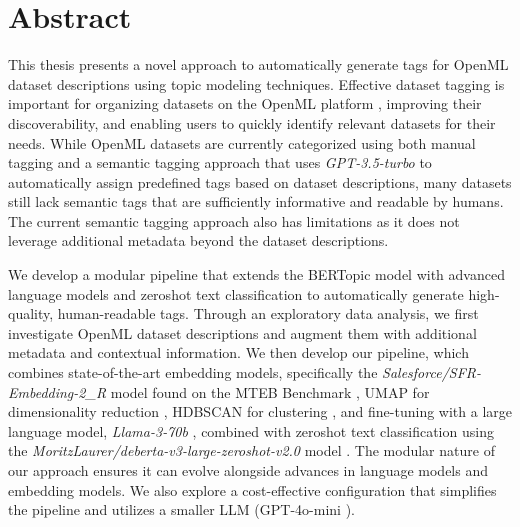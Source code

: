 \chapter*{Abstract}\label{chapter:abstract}

This thesis presents a novel approach to automatically generate tags for OpenML dataset descriptions using topic modeling techniques. Effective dataset tagging is important for organizing datasets on the OpenML platform \cite{vanschoren_openml_2014}, improving their discoverability, and enabling users to quickly identify relevant datasets for their needs. While OpenML datasets are currently categorized using both manual tagging and a semantic tagging approach that uses \textit{GPT-3.5-turbo} to automatically assign predefined tags based on dataset descriptions, many datasets still lack semantic tags that are sufficiently informative and readable by humans. The current semantic tagging approach also has limitations as it does not leverage additional metadata beyond the dataset descriptions.

We develop a modular pipeline that extends the BERTopic model \cite{grootendorst_bertopic_2022} with advanced language models and zeroshot text classification to automatically generate high-quality, human-readable tags. Through an exploratory data analysis, we first investigate OpenML dataset descriptions and augment them with additional metadata and contextual information. We then develop our pipeline, which combines state-of-the-art embedding models, specifically the \textit{Salesforce/SFR-Embedding-2\_R} \cite{noauthor_salesforcesfr-embedding-2_r_2024} model found on the MTEB Benchmark \cite{muennighoff_mteb_2023}, UMAP for dimensionality reduction \cite{mcinnes_umap_2020}, HDBSCAN for clustering \cite{campello_density-based_2013, mcinnes_accelerated_2017, mcinnes_hdbscan_2017}, and fine-tuning with a large language model, \textit{Llama-3-70b} \cite{noauthor_introducing_nodate} , combined with zeroshot text classification using the \textit{MoritzLaurer/deberta-v3-large-zeroshot-v2.0} model \cite{noauthor_milanlproccontextualized-topic-models_2024}. The modular nature of our approach ensures it can evolve alongside advances in language models and embedding models. We also explore a cost-effective configuration that simplifies the pipeline and utilizes a smaller LLM (GPT-4o-mini \cite{noauthor_gpt-4o_nodate}).


